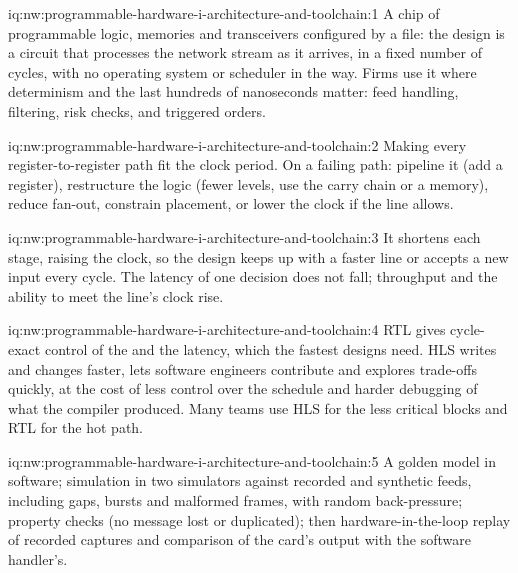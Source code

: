\begin{solution}{iq:nw:programmable-hardware-i-architecture-and-toolchain:1}
A chip of programmable logic, memories and transceivers configured by a file: the design is a circuit that processes the network stream
as it arrives, in a fixed number of cycles, with no operating system or scheduler in the way. Firms use it where determinism and the last
hundreds of nanoseconds matter: feed handling, filtering, risk checks, and triggered orders.
\end{solution}

\begin{solution}{iq:nw:programmable-hardware-i-architecture-and-toolchain:2}
Making every register-to-register path fit the clock period. On a failing path: pipeline it (add a register), restructure the logic
(fewer levels, use the carry chain or a memory), reduce fan-out, constrain placement, or lower the clock if the line allows.
\end{solution}

\begin{solution}{iq:nw:programmable-hardware-i-architecture-and-toolchain:3}
It shortens each stage, raising the clock, so the design keeps up with a faster line or accepts a new input every cycle. The latency of
one decision does not fall; throughput and the ability to meet the line's clock rise.
\end{solution}

\begin{solution}{iq:nw:programmable-hardware-i-architecture-and-toolchain:4}
RTL gives cycle-exact control of the  and the latency, which the fastest designs need. HLS writes and changes faster, lets
software engineers contribute and explores trade-offs quickly, at the cost of less control over the schedule and harder debugging of what
the compiler produced. Many teams use HLS for the less critical blocks and RTL for the hot path.
\end{solution}

\begin{solution}{iq:nw:programmable-hardware-i-architecture-and-toolchain:5}
A golden model in software; simulation in two simulators against recorded and synthetic feeds, including gaps, bursts and malformed frames,
with random back-pressure; property checks (no message lost or duplicated); then hardware-in-the-loop replay of recorded captures and
comparison of the card's output with the software handler's.
\end{solution}

